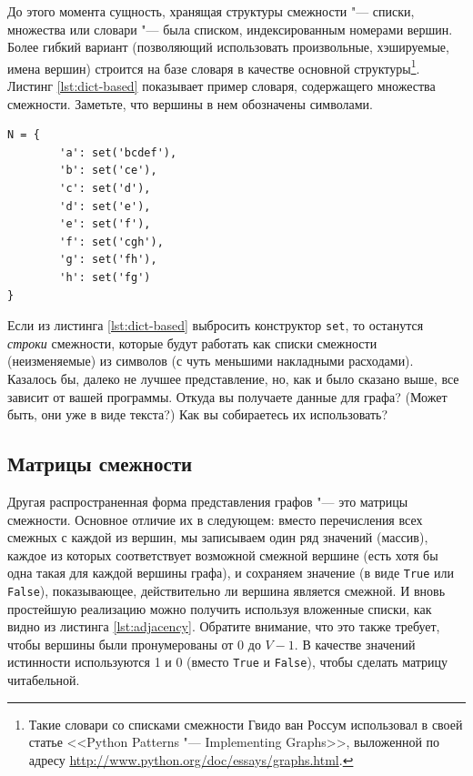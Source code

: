 До этого момента сущность, хранящая структуры смежности "--- списки, множества или словари "--- была списком, индексированным номерами вершин. Более гибкий вариант (позволяющий использовать произвольные, хэшируемые, имена вершин) строится на базе словаря в качестве основной структуры\footnote{Такие словари со списками смежности Гвидо ван Россум использовал в своей статье <<Python Patterns "--- Implementing Graphs>>, выложенной по адресу \url{http://www.python.org/doc/essays/graphs.html}.}. Листинг \ref{lst:dict-based} показывает пример словаря, содержащего множества смежности. Заметьте, что вершины в нем обозначены символами.

\begin{lstlisting}[caption={Словарь с множествами смежности}, label={lst:dict-based}]
N = {
		'a': set('bcdef'),
		'b': set('ce'),
		'c': set('d'),
		'd': set('e'),
		'e': set('f'),
		'f': set('cgh'),
		'g': set('fh'),
		'h': set('fg')
}
\end{lstlisting}

\begin{note}
Если из листинга \ref{lst:dict-based} выбросить конструктор \texttt{set}, то останутся \textit{строки} смежности, которые будут работать как списки смежности (неизменяемые) из символов (с чуть меньшими накладными расходами). Казалось бы, далеко не лучшее представление, но, как и было сказано выше, все зависит от вашей программы. Откуда вы получаете данные для графа? (Может быть, они уже в виде текста?) Как вы собираетесь их использовать?
\end{note}

\subsection{Матрицы смежности}
\label{sec:adjacency-matrix}

Другая распространенная форма представления графов "--- это матрицы смежности. Основное отличие их в следующем: вместо перечисления всех смежных с каждой из вершин, мы записываем один ряд значений (массив), каждое из которых соответствует возможной смежной вершине (есть хотя бы одна такая для каждой вершины графа), и сохраняем значение (в виде \texttt{True} или \texttt{False}), показывающее, действительно ли вершина является смежной. И вновь простейшую реализацию можно получить используя вложенные списки, как видно из листинга \ref{lst:adjacency}. Обратите внимание, что это также требует, чтобы вершины были пронумерованы от $0$ до $V-1$. В качестве значений истинности используются 1 и 0 (вместо \texttt{True} и \texttt{False}), чтобы сделать матрицу читабельной.

